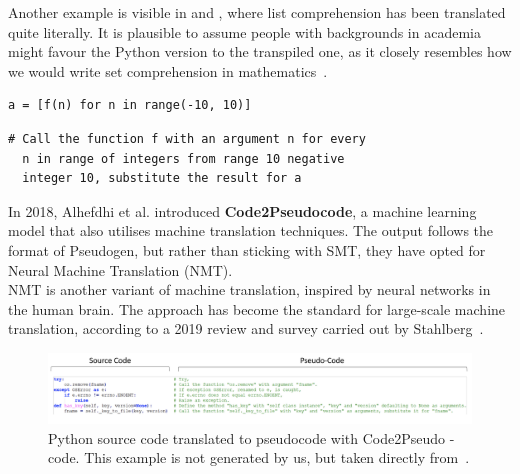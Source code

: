 Another example is visible in  and , where list comprehension has been translated quite literally. It is plausible to assume people with backgrounds in academia might favour the Python version to the transpiled one, as it closely resembles how we would write set comprehension in mathematics~\cite[11]{setComprehension}. \\

\begin{lstlisting}[caption={A list comprehension of applying f(n) to integers in the range -10 to 10, and placing the results in a list.}, captionpos=b, label={listComprehensionPython}]
a = [f(n) for n in range(-10, 10)]
\end{lstlisting}

\begin{lstlisting}[caption={Pseudocode version of \Cref{listComprehensionPython} generated with Pseudogen. This example is not generated by us, but copied from a video on their website.}, captionpos=b, label={listComprehensionPseudogen}]
# Call the function f with an argument n for every
  n in range of integers from range 10 negative
  integer 10, substitute the result for a
\end{lstlisting}

In 2018, Alhefdhi et al. introduced \textbf{Code2Pseudocode}, a machine learning model that also utilises machine translation techniques. The output follows the format of Pseudogen, but rather than sticking with SMT, they have opted for Neural Machine Translation (NMT). \\

NMT is another variant of machine translation, inspired by neural networks in the human brain. The approach has become the standard for large-scale machine translation, according to a 2019 review and survey carried out by Stahlberg~\cite{nmtOverSmt}. \\

\begin{figure}[ht]
    \centering
    \includegraphics[scale=.37]{assets/chapter3/Code2Pseudocode.png}
    \caption{Python source code translated to pseudocode with Code2Pseudo -code. This example is not generated by us, but taken directly from~\cite{code2pseudocode}.}
    \label{code2Pseudocode}
\end{figure}

